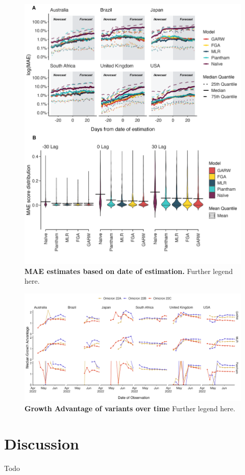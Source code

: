\documentclass[11pt,oneside,letterpaper]{article}
\begin{document}



\begin{figure}[h]
	\centering
	\includegraphics[width=1.0\textwidth]{figures/Figure2.png}
	\caption{\textbf{MAE estimates based on date of estimation.}
	Further legend here.
	}
	\label{Figure 2}
\end{figure}


\begin{figure}[h]
	\centering
	\includegraphics[width=1.0\textwidth]{figures/Figure3.png}
	\caption{\textbf{Growth Advantage of variants over time}
	Further legend here.
	}
	\label{Figure 2}
\end{figure}







\section*{Discussion}

Todo



\end{document}
